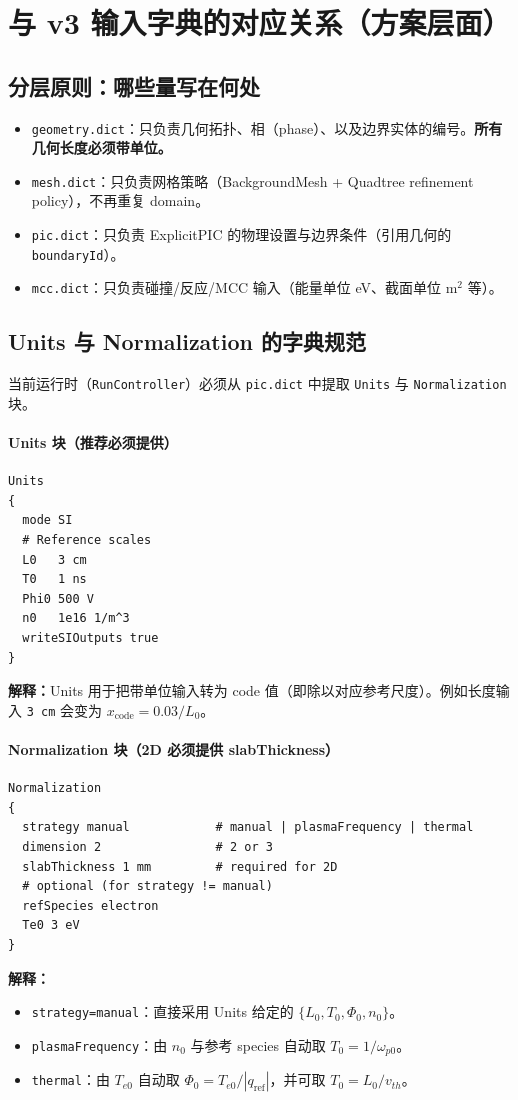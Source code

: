 \documentclass[11pt,a4paper]{ctexart}
\begin{document}
\section{与 v3 输入字典的对应关系（方案层面）}
\subsection{分层原则：哪些量写在何处}
\begin{itemize}[leftmargin=2em]
  \item \texttt{geometry.dict}：只负责几何拓扑、相（phase）、以及边界实体的编号。\textbf{所有几何长度必须带单位。}
  \item \texttt{mesh.dict}：只负责网格策略（BackgroundMesh + Quadtree refinement policy），不再重复 domain。
  \item \texttt{pic.dict}：只负责 ExplicitPIC 的物理设置与边界条件（引用几何的 \texttt{boundaryId}）。
  \item \texttt{mcc.dict}：只负责碰撞/反应/MCC 输入（能量单位 eV、截面单位 m$^2$ 等）。
\end{itemize}

\subsection{Units 与 Normalization 的字典规范}
当前运行时（\texttt{RunController}）必须从 \texttt{pic.dict} 中提取 \texttt{Units} 与 \texttt{Normalization} 块。

\paragraph{Units 块（推荐必须提供）}
\begin{lstlisting}
Units
{
  mode SI
  # Reference scales
  L0   3 cm
  T0   1 ns
  Phi0 500 V
  n0   1e16 1/m^3
  writeSIOutputs true
}
\end{lstlisting}
\textbf{解释：}Units 用于把带单位输入转为 code 值（即除以对应参考尺度）。例如长度输入 \texttt{3 cm} 会变为 $x_{\mathrm{code}}=0.03/L_0$。

\paragraph{Normalization 块（2D 必须提供 slabThickness）}
\begin{lstlisting}
Normalization
{
  strategy manual            # manual | plasmaFrequency | thermal
  dimension 2                # 2 or 3
  slabThickness 1 mm         # required for 2D
  # optional (for strategy != manual)
  refSpecies electron
  Te0 3 eV
}
\end{lstlisting}
\textbf{解释：}
\begin{itemize}[leftmargin=2em]
  \item \texttt{strategy=manual}：直接采用 Units 给定的 $\{L_0,T_0,\Phi_0,n_0\}$。
  \item \texttt{plasmaFrequency}：由 $n_0$ 与参考 species 自动取 $T_0=1/\omega_{p0}$。
  \item \texttt{thermal}：由 $T_{e0}$ 自动取 $\Phi_0=T_{e0}/|q_{\mathrm{ref}}|$，并可取 $T_0=L_0/v_{th}$。
\end{itemize}
\end{document}
